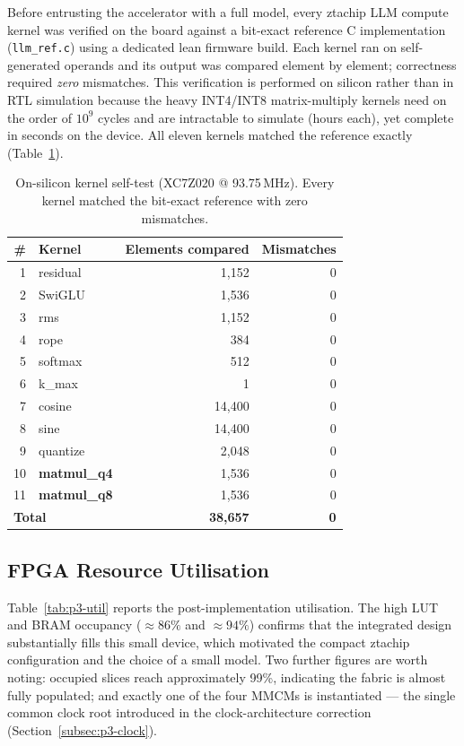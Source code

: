 Before entrusting the accelerator with a full model, every ztachip LLM compute kernel was verified on
the board against a bit-exact reference C implementation (\texttt{llm\_ref.c}) using a dedicated lean
firmware build. Each kernel ran on self-generated operands and its output was compared element by
element; correctness required \emph{zero} mismatches. This verification is performed on silicon
rather than in RTL simulation because the heavy INT4/INT8 matrix-multiply kernels need on the order of
$10^{9}$ cycles and are intractable to simulate (hours each), yet complete in seconds on the device.
All eleven kernels matched the reference exactly (Table~\ref{tab:p3-kernels}).

\begin{table}[H]
\centering
\caption{On-silicon kernel self-test (XC7Z020 @ 93.75\,MHz). Every kernel matched the bit-exact
reference with zero mismatches.}
\label{tab:p3-kernels}
\renewcommand{\arraystretch}{1.15}
\begin{tabular}{@{}rlrr@{}}
\toprule
\textbf{\#} & \textbf{Kernel} & \textbf{Elements compared} & \textbf{Mismatches} \\
\midrule
1 & residual          & 1{,}152  & 0 \\
2 & SwiGLU            & 1{,}536  & 0 \\
3 & rms               & 1{,}152  & 0 \\
4 & rope              & 384      & 0 \\
5 & softmax           & 512      & 0 \\
6 & k\_max            & 1        & 0 \\
7 & cosine            & 14{,}400 & 0 \\
8 & sine              & 14{,}400 & 0 \\
9 & quantize          & 2{,}048  & 0 \\
10 & \textbf{matmul\_q4} & 1{,}536 & 0 \\
11 & \textbf{matmul\_q8} & 1{,}536 & 0 \\
\midrule
\multicolumn{2}{l}{\textbf{Total}} & \textbf{38{,}657} & \textbf{0} \\
\bottomrule
\end{tabular}
\end{table}

\subsection{FPGA Resource Utilisation}

Table~\ref{tab:p3-util} reports the post-implementation utilisation. The high LUT and BRAM occupancy
($\approx 86\%$ and $\approx 94\%$) confirms that the integrated design substantially fills this
small device, which motivated the compact ztachip configuration and the choice of a small model.
Two further figures are worth noting: occupied slices reach approximately 99\%, indicating the fabric
is almost fully populated; and exactly one of the four MMCMs is instantiated --- the single common
clock root introduced in the clock-architecture correction (Section~\ref{subsec:p3-clock}).

